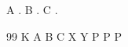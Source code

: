 \documentclass{article}
\begin{document}
A \cite{x2,a,y}. B \cite{k,c,b}. C \cite{p4,p3,p5}.
\begin{thebibliography}{99}
 K
 A
 B
 C
 X
 Y
 P
 P
 P
\end{thebibliography}
\end{document}
